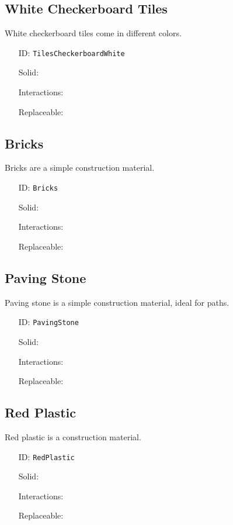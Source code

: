 \subsection{White Checkerboard Tiles}\label{subsec:blocks_white checkerboard tiles}
White checkerboard tiles come in different colors.
\newline
\begin{itemize}[nosep]
    \item[ID:] \texttt{TilesCheckerboardWhite}
    \item[Solid:]  \Checkmark \item[Interactions:]  \Checkmark \item[Replaceable:]  \XSolidBrush
\end{itemize}

\subsection{Bricks}\label{subsec:blocks_bricks}
Bricks are a simple construction material.
\newline
\begin{itemize}[nosep]
    \item[ID:] \texttt{Bricks}
    \item[Solid:]  \Checkmark \item[Interactions:]  \XSolidBrush \item[Replaceable:]  \XSolidBrush
\end{itemize}

\subsection{Paving Stone}\label{subsec:blocks_paving stone}
Paving stone is a simple construction material, ideal for paths.
\newline
\begin{itemize}[nosep]
    \item[ID:] \texttt{PavingStone}
    \item[Solid:]  \Checkmark \item[Interactions:]  \XSolidBrush \item[Replaceable:]  \XSolidBrush
\end{itemize}

\subsection{Red Plastic}\label{subsec:blocks_red plastic}
Red plastic is a construction material.
\newline
\begin{itemize}[nosep]
    \item[ID:] \texttt{RedPlastic}
    \item[Solid:]  \Checkmark \item[Interactions:]  \XSolidBrush \item[Replaceable:]  \XSolidBrush
\end{itemize}

